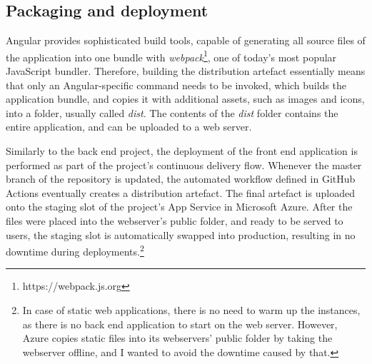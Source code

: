 \subsection{Packaging and deployment}

Angular provides sophisticated build tools, capable of generating all source files of the application into one bundle with \emph{webpack}\footnote{https://webpack.js.org}, one of today's most popular JavaScript bundler. Therefore, building the distribution artefact essentially means that only an Angular-specific command needs to be invoked, which builds the application bundle, and copies it with additional assets, such as images and icons, into a folder, usually called \emph{dist}. The contents of the \emph{dist} folder contains the entire application, and can be uploaded to a web server.

Similarly to the back end project, the deployment of the front end application is performed as part of the project’s continuous delivery flow. Whenever the master branch of the repository is updated, the automated workflow defined in GitHub Actions eventually creates a distribution artefact. The final artefact is uploaded onto the staging slot of the project’s App Service in Microsoft Azure. After the files were placed into the webserver's public folder, and ready to be served to users, the staging slot is automatically swapped into production, resulting in no downtime during deployments.\footnote{In case of static web applications, there is no need to warm up the instances, as there is no back end application to start on the web server. However, Azure copies static files into its webservers' public folder by taking the webserver offline, and I wanted to avoid the downtime caused by that.}
